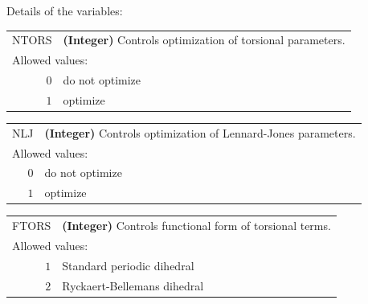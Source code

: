 \documentclass[10pt,a4paper]{report}
\numberwithin{equation}{section}
\begin{document}
\noindent Details of the variables:
\vspace{2ex}

{
\begin{tabular}{r@{ : }l}
\label{descr:ntors}
     NTORS&\textbf{(Integer)} Controls optimization of torsional parameters.                                                       \\ 
\multicolumn{2}{l}{Allowed values:} \\ 
     \(0\)&do not optimize                                                                                      \\ 
     \(1\)&optimize                                                                                             \\ 
\end{tabular}
\vspace{1ex}
}

{
\begin{tabular}{r@{ : }l}
\label{descr:nlj}
       NLJ&\textbf{(Integer)} Controls optimization of Lennard-Jones parameters.                                                   \\ 
\multicolumn{2}{l}{Allowed values:} \\ 
     \(0\)&do not optimize                                                                                      \\ 
     \(1\)&optimize                                                                                             \\ 
\end{tabular}
\vspace{1ex}
}


{
\begin{tabular}{r@{ : }l}
\label{descr:ftors}
     FTORS&\textbf{(Integer)} Controls functional form of torsional terms.                                                         \\ 
\multicolumn{2}{l}{Allowed values:} \\ 
     \(1\)&Standard periodic dihedral                                                                           \\ 
     \(2\)&Ryckaert-Bellemans dihedral                                                                          \\ 
\end{tabular}
\vspace{1ex}
}
\end{document}
